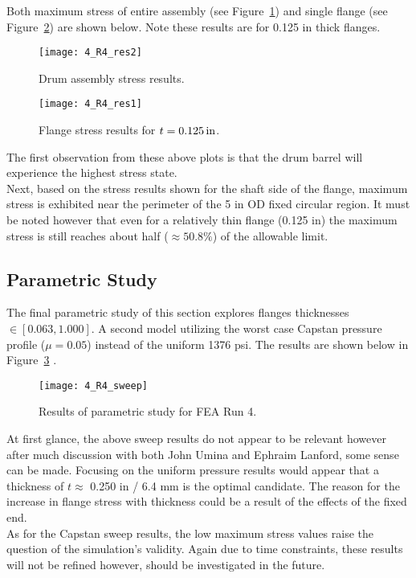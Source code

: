 Both maximum stress of entire assembly (see Figure~\ref{fig:4_R4_res2}) and single flange (see Figure~\ref{fig:4_R4_res1}) are shown below. Note these results are for 0.125 in thick flanges.

\begin{figure}[H]
	\centering
	\texttt{[image: 4\_R4\_res2]}
	\caption{Drum assembly stress results.}
	\label{fig:4_R4_res2}
\end{figure}
\begin{figure}[H]
	\centering
	\texttt{[image: 4\_R4\_res1]}
	\caption{Flange stress results for $t=0.125 \,\mathrm{in}$.}
	\label{fig:4_R4_res1}
\end{figure}

The first observation from these above plots is that the drum barrel will experience the highest stress state.\\

Next, based on the stress results shown for the shaft side of the flange, maximum stress is exhibited near the perimeter of the 5 in OD fixed circular region. It must be noted however that even for a relatively thin flange (0.125 in) the maximum stress is still reaches about half ($\approx 50.8\%$) of the allowable limit.

\subsection{Parametric Study}

The final parametric study of this section explores flanges thicknesses $\in [0.063, 1.000]$. A second model utilizing the worst case Capstan pressure profile ($\mu=0.05$) instead of the uniform 1376 psi. The results are shown below in Figure~\ref{fig:4_R4_sweep} \cite{EXCEL}.

\begin{figure}[H]
	\centering
	\texttt{[image: 4\_R4\_sweep]}
	\caption{Results of parametric study for FEA Run 4.}
	\label{fig:4_R4_sweep}
\end{figure}

At first glance, the above sweep results do not appear to be relevant however after much discussion with both John Umina and Ephraim Lanford, some sense can be made. Focusing on the uniform pressure results would appear that a thickness of $t\approx$ 0.250 in / 6.4 mm  is the optimal candidate. The reason for the increase in flange stress with thickness could be a result of the effects of the fixed end.\\

As for the Capstan sweep results, the low maximum stress values raise the question of the simulation's validity. Again due to time constraints, these results will not be refined however, should be investigated in the future.

